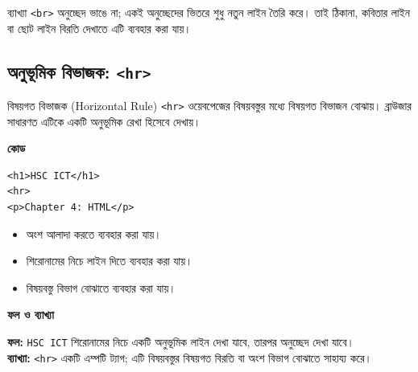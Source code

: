\begin{keypointbox}{ব্যাখ্যা}
\texttt{<br>} অনুচ্ছেদ ভাঙে না; একই অনুচ্ছেদের ভিতরে শুধু নতুন লাইন তৈরি করে। তাই ঠিকানা, কবিতার লাইন বা ছোট লাইন বিরতি দেখাতে এটি ব্যবহার করা যায়।
\end{keypointbox}

\subsection{অনুভূমিক বিভাজক: \texttt{<hr>}}

\begin{definitionbox}{বিষয়গত বিভাজক (Horizontal Rule)}
\texttt{<hr>} ওয়েবপেজের বিষয়বস্তুর মধ্যে বিষয়গত বিভাজন বোঝায়। ব্রাউজার সাধারণত এটিকে একটি অনুভূমিক রেখা হিসেবে দেখায়।
\end{definitionbox}

\par\noindent
\begin{minipage}[t]{.50\linewidth}\vspace{0pt}\small
\textbf{\color{chFourTeal}কোড}\par
\begin{verbatim}
<h1>HSC ICT</h1>
<hr>
<p>Chapter 4: HTML</p>
\end{verbatim}

\par\smallskip
\end{minipage}\hfill
\begin{minipage}[t]{.46\linewidth}\vspace{0pt}\small
\begin{itemize}
\item অংশ আলাদা করতে ব্যবহার করা যায়।
\item শিরোনামের নিচে লাইন দিতে ব্যবহার করা যায়।
\item বিষয়বস্তু বিভাগ বোঝাতে ব্যবহার করা যায়।
\end{itemize}
\textbf{\color{chFourTeal}ফল ও ব্যাখ্যা}\par
\textbf{ফল:} \texttt{HSC ICT} শিরোনামের নিচে একটি অনুভূমিক লাইন দেখা যাবে, তারপর অনুচ্ছেদ দেখা যাবে।\\
\textbf{ব্যাখ্যা:} \texttt{<hr>} একটি এম্পটি ট্যাগ; এটি বিষয়বস্তুর বিষয়গত বিরতি বা অংশ বিভাগ বোঝাতে সাহায্য করে।
\par\smallskip
\end{minipage}\par


